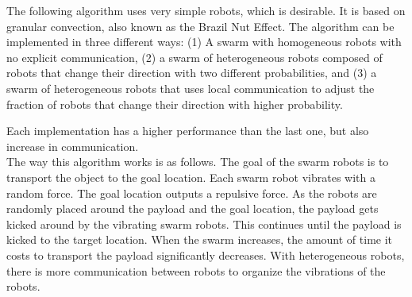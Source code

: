 

The following algorithm uses very simple robots, which is desirable. \cite{sugawara2012object}
It is based on granular convection, also known as the Brazil Nut Effect. 
The algorithm can be implemented in three different ways: (1) A swarm with homogeneous robots with no explicit communication, 
(2) a swarm of heterogeneous robots composed of robots that change their direction with two different probabilities, 
and (3) a swarm of heterogeneous robots that uses local communication to adjust the fraction of robots that change their direction with higher probability. 

Each implementation has a higher performance than the last one, but also increase in communication. \\ 
The way this algorithm works is as follows. 
The goal of the swarm robots is to transport the object to the goal location. 
Each swarm robot vibrates with a random force. The goal location outputs a repulsive force. 
As the robots are randomly placed around the payload and the goal location, the payload gets kicked around by the vibrating swarm robots.
This continues until the payload is kicked to the target location.
When the swarm increases, the amount of time it costs to transport the payload significantly decreases. 
With heterogeneous robots, there is more communication between robots to organize the vibrations of the robots. \\

